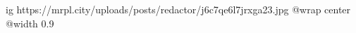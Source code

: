  
 
 
 
 

\ifcmt
  ig https://mrpl.city/uploads/posts/redactor/j6c7qe6l7jrxga23.jpg
  @wrap center
  @width 0.9
\fi
